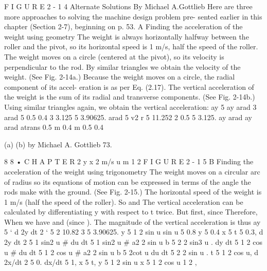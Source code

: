 \documentclass[10pt,oneside]{article}
\newcommand{\TipsRunning}[1]{\par\vspace{2bp}{\centering\footnotesize #1\par}\vspace{2bp}}
\begin{document}
\TipsRunning{L A W S  A N D  I N T U I T I O N • 8 7 v 0.5 m 0.4 m 1 m/s v 1 0.5 0.4}

F I G U R E  2 - 1 4 Alternate Solutions By Michael A.Gottlieb Here are three more approaches to solving the machine design problem pre- sented earlier in this chapter (Section 2-7), beginning on p. 53. A Finding the acceleration of the weight using geometry The weight is always horizontally halfway between the roller and the pivot, so its horizontal speed is 1 m/s, half the speed of the roller. The weight moves on a circle (centered at the pivot), so its velocity is perpendicular to the rod. By similar triangles we obtain the velocity of the weight. (See Fig. 2-14a.) Because the weight moves on a circle, the radial component of its accel- eration is as per Eq. (2.17). The vertical acceleration of the weight is the sum of its radial and transverse components. (See Fig. 2-14b.) Using similar triangles again, we obtain the vertical acceleration: ay 5 ay arad 3 arad 5 0.5 0.4 3 3.125 5 3.90625. arad 5 v2 r 5 11.252 2 0.5 5 3.125. ay arad ay arad atrans 0.5 m 0.4 m 0.5 0.4\par

(a) (b) by Michael A. Gottlieb 73.\par

8 8 • C H A P T E R  2 y x 2 m/s u m 1 2 F I G U R E  2 - 1 5 B Finding the acceleration of the weight using trigonometry The weight moves on a circular arc of radius so its equations of motion can be expressed in terms of the angle the rods make with the ground. (See Fig. 2-15.) The horizontal speed of the weight is 1 m/s (half the speed of the roller). So and The vertical acceleration can be calculated by differentiating y with respect to t twice. But first, since Therefore, When we have and (since ). The magnitude of the vertical acceleration is thus ay 5 `  d 2y dt 2 ` 5 2 10.82 3 5 3.90625. y 5 1 2  sin u sin u 5 0.8 y 5 0.4 x 5 t 5 0.3, d 2y dt 2 5 1 sin2 u \#  du dt 5 1 sin2 u \# a2 2 sin u b 5 2 2 sin3 u . dy dt 5 1 2  cos u \#  du dt 5 1 2  cos u \# a2 2 sin u b 5 2cot u du dt 5 2 2 sin u . t 5 1 2 cos u, d 2x/dt 2 5 0. dx/dt 5 1, x 5 t, y 5 1 2  sin u x 5 1 2  cos u 1 2 ,\par
\end{document}

